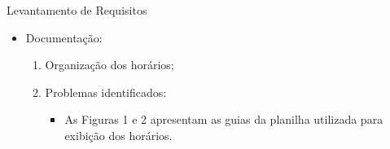 \begin{frame}{Levantamento de Requisitos}
    \begin{itemize}
        \item Documentação: \vspace{0.5cm}
              \begin{enumerate}
                  \item Organização dos horários; \vspace{0.5cm}
                  \item Problemas identificados: \vspace{0.5cm}
                        \begin{itemize}
                            \item As Figuras 1 e 2 apresentam as guias da planilha utilizada para exibição dos horários.
                        \end{itemize}
              \end{enumerate}
    \end{itemize}
\end{frame}


